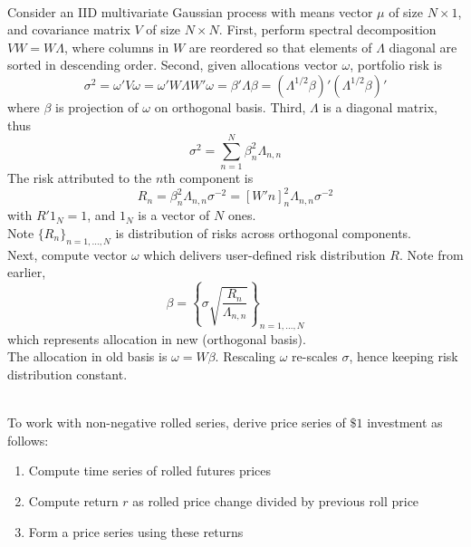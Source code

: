 \begin{method} \\
Consider an IID multivariate Gaussian process with means vector $\mu$ of size $N \times 1$, and covariance matrix $V$ of size $N \times N$. First, perform spectral decomposition $VW = W \Lambda$, where columns in $W$ are reordered so that elements of $\Lambda$ diagonal are sorted in descending order. Second, given allocations vector $\omega$, portfolio risk is
\begin{equation}
\sigma^2 = \omega' V \omega = \omega' W \Lambda W' \omega = \beta' \Lambda \beta = (\Lambda^{1/2} \beta)' (\Lambda^{1/2} \beta)' \nonumber
\end{equation}
 where $\beta$ is projection of $\omega$ on orthogonal basis. Third, $\Lambda$ is a diagonal matrix, thus
\begin{equation}
\sigma^2 = \sum\limits_{n=1}^N \beta^2_n \Lambda_{n,n} \nonumber
\end{equation}
The risk attributed to the $n$th component is
\begin{equation}
R_n = \beta^2_n \Lambda_{n,n}\sigma^{-2} = [W' n]^2_n \Lambda_{n,n} \sigma^{-2} \nonumber
\end{equation}
with $R' 1_N = 1$, and $1_N$ is a vector of $N$ ones.\\
Note $\{R_n\}_{n=1, \ldots, N}$ is distribution of risks across orthogonal components.\\
Next, compute vector $\omega$ which delivers user-defined risk distribution $R$. Note from earlier,
\begin{equation}
\beta = \left\{ \sigma \sqrt{\frac{R_n}{\Lambda_{n,n}}} \right\}_{n = 1, \ldots, N} \nonumber
\end{equation}
which represents allocation in new (orthogonal basis).\\
The allocation in old basis is $\omega = W \beta$. Rescaling $\omega$ re-scales $\sigma$, hence keeping risk distribution constant.
\end{method}

\begin{method} \\
To work with non-negative rolled series, derive price series of $\$ 1$ investment as follows:
\begin{enumerate}[label=\roman*.]
\setlength{\itemsep}{0pt}
\item Compute time series of rolled futures prices
\item Compute return $r$ as rolled price change divided by previous roll price
\item Form a price series using these returns
\end{enumerate}
\end{method}

